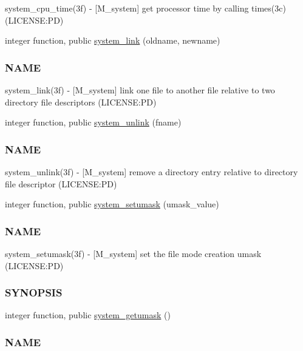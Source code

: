 \begin{DoxyCompactItemize}
\begin{DoxyCompactList}
system\+\_\+cpu\+\_\+time(3f) -\/ \mbox{[}M\+\_\+system\mbox{]} get processor time by calling times(3c) (L\+I\+C\+E\+N\+SE\+:PD) \end{DoxyCompactList}\item 
integer function, public \mbox{\hyperlink{namespacem__system_aa77d9c9ae68750f515ba3d04d022c43c}{system\+\_\+link}} (oldname, newname)
\begin{DoxyCompactList}\small\item\em \subsubsection*{N\+A\+ME}

system\+\_\+link(3f) -\/ \mbox{[}M\+\_\+system\mbox{]} link one file to another file relative to two directory file descriptors (L\+I\+C\+E\+N\+SE\+:PD) \end{DoxyCompactList}\item 
integer function, public \mbox{\hyperlink{namespacem__system_a14ce0b9177815bc357dbdf3778687bb7}{system\+\_\+unlink}} (fname)
\begin{DoxyCompactList}\small\item\em \subsubsection*{N\+A\+ME}

system\+\_\+unlink(3f) -\/ \mbox{[}M\+\_\+system\mbox{]} remove a directory entry relative to directory file descriptor (L\+I\+C\+E\+N\+SE\+:PD) \end{DoxyCompactList}\item 
integer function, public \mbox{\hyperlink{namespacem__system_a04fd02e6f5ce2f8ecdfb577e1490feba}{system\+\_\+setumask}} (umask\+\_\+value)
\begin{DoxyCompactList}\small\item\em \subsubsection*{N\+A\+ME}

system\+\_\+setumask(3f) -\/ \mbox{[}M\+\_\+system\mbox{]} set the file mode creation umask (L\+I\+C\+E\+N\+SE\+:PD) \subsubsection*{S\+Y\+N\+O\+P\+S\+IS}\end{DoxyCompactList}\item 
integer function, public \mbox{\hyperlink{namespacem__system_aa9ca951be39d2ea738d627cf42c00ddd}{system\+\_\+getumask}} ()
\begin{DoxyCompactList}\small\item\em \subsubsection*{N\+A\+ME}


\end{DoxyCompactList}
\end{DoxyCompactItemize}

